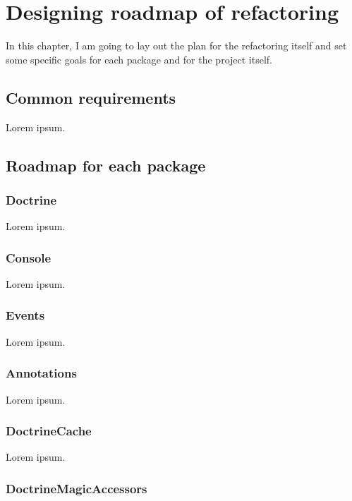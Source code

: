 \chapter{Designing roadmap of refactoring}

In this chapter, I am going to lay out the plan for the refactoring itself and set some specific goals for each package and for the project itself.

\section{Common requirements}

Lorem ipsum.

\section{Roadmap for each package}

\tocless\subsection{Doctrine}

Lorem ipsum.

\tocless\subsection{Console}

Lorem ipsum.

\tocless\subsection{Events}

Lorem ipsum.

\tocless\subsection{Annotations}

Lorem ipsum.

\tocless\subsection{DoctrineCache}

Lorem ipsum.

\tocless\subsection{DoctrineMagicAccessors}

